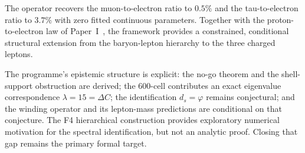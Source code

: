 \documentclass[12pt]{article}
\newcommand{\phig}{\varphi}
\newcommand{\ds}{d_s}
\begin{document}
The operator recovers the muon-to-electron ratio to $0.5\%$ and the tau-to-electron ratio to $3.7\%$ with zero fitted continuous parameters. Together with the proton-to-electron law of Paper~I~\citep{SmartI}, the framework provides a constrained, conditional structural extension from the baryon-lepton hierarchy to the three charged leptons.

The programme's epistemic structure is explicit: the no-go theorem and the shell-support obstruction are derived; the 600-cell contributes an exact eigenvalue correspondence $\lambda = 15 = \Delta C$; the identification $\ds = \phig$ remains conjectural; and the winding operator and its lepton-mass predictions are conditional on that conjecture. The F4 hierarchical construction provides exploratory numerical motivation for the spectral identification, but not an analytic proof. Closing that gap remains the primary formal target.



\end{document}
